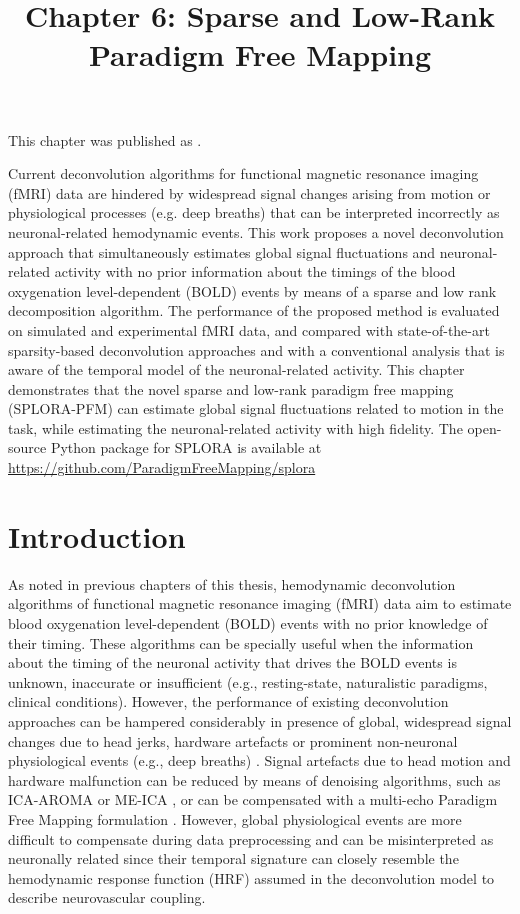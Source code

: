\title{Chapter 6: Sparse and Low-Rank Paradigm Free Mapping}
\label{cha:low-rank}

This chapter was published as \cite{Urunuela2021LowRankSparse}.

Current deconvolution algorithms for functional magnetic resonance imaging
(fMRI) data are hindered by widespread signal changes arising from motion or
physiological processes (e.g. deep breaths) that can be interpreted incorrectly
as neuronal-related hemodynamic events. This work proposes a novel deconvolution
approach that simultaneously estimates global signal fluctuations and
neuronal-related activity with no prior information about the timings of the
blood oxygenation level-dependent (BOLD) events by means of a sparse and low
rank decomposition algorithm. The performance of the proposed method is
evaluated on simulated and experimental fMRI data, and compared with
state-of-the-art sparsity-based deconvolution approaches and with a conventional
analysis that is aware of the temporal model of the neuronal-related activity.
This chapter demonstrates that the novel sparse and low-rank paradigm free mapping (SPLORA-PFM) can estimate global
signal fluctuations related to motion in the task, while estimating the
neuronal-related activity with high fidelity. The open-source Python package for
SPLORA is available at
\url{https://github.com/ParadigmFreeMapping/splora}


\section{Introduction}
\label{sec:low_rank_intro}

As noted in previous chapters of this thesis, hemodynamic deconvolution
algorithms of functional magnetic resonance imaging (fMRI) data aim to estimate
blood oxygenation level-dependent (BOLD) events with no prior knowledge of their
timing. These algorithms can be specially useful when the information about the
timing of the neuronal activity that drives the BOLD events is unknown,
inaccurate or insufficient (e.g., resting-state, naturalistic paradigms,
clinical conditions). However, the performance of existing deconvolution
approaches can be hampered considerably in presence of global, widespread signal
changes due to head jerks, hardware artefacts or prominent non-neuronal
physiological events (e.g., deep breaths)
\citep{Power2017Sourcesimplicationswhole}. Signal artefacts due to head motion
and hardware malfunction can be reduced by means of denoising algorithms, such
as ICA-AROMA \citep{Pruim2015ICAAROMArobust} or ME-ICA
\citep{Kundu2012DifferentiatingBOLDnon}, or can be compensated with a multi-echo
Paradigm Free Mapping formulation
\citep{CaballeroGaudes2019deconvolutionalgorithmmulti}. However, global
physiological events are more difficult to compensate during data preprocessing
\citep{Power2018RiddingfMRIdata} and can be misinterpreted as neuronally related
since their temporal signature can closely resemble the hemodynamic response
function (HRF) assumed in the deconvolution model to describe neurovascular
coupling.

